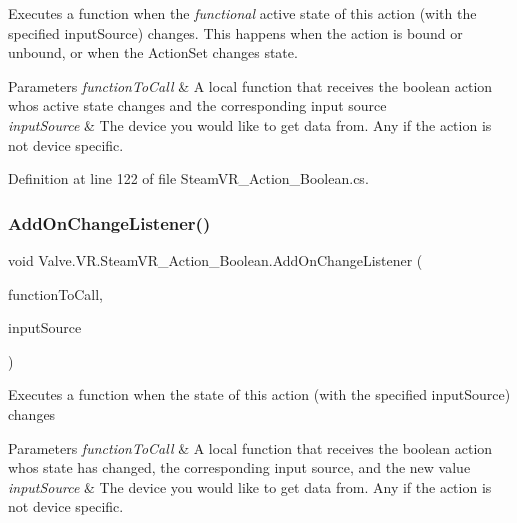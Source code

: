 Executes a function when the {\itshape functional} active state of this action (with the specified input\+Source) changes. This happens when the action is bound or unbound, or when the Action\+Set changes state. 


\begin{DoxyParams}{Parameters}
{\em function\+To\+Call} & A local function that receives the boolean action who\textquotesingle{}s active state changes and the corresponding input source\\
\hline
{\em input\+Source} & The device you would like to get data from. Any if the action is not device specific.\\
\hline
\end{DoxyParams}


Definition at line 122 of file Steam\+V\+R\+\_\+\+Action\+\_\+\+Boolean.\+cs.

\mbox{\label{class_valve_1_1_v_r_1_1_steam_v_r___action___boolean_a4f96bf86478f1e5f91dec7c32a4a8616}} 
\subsubsection{\texorpdfstring{AddOnChangeListener()}{AddOnChangeListener()}}
{\footnotesize\ttfamily void Valve.\+V\+R.\+Steam\+V\+R\+\_\+\+Action\+\_\+\+Boolean.\+Add\+On\+Change\+Listener (\begin{DoxyParamCaption}\item[{\mbox{\hyperlink{class_valve_1_1_v_r_1_1_steam_v_r___action___boolean_a9dbdff089d05d822688005fa19fef120}{Change\+Handler}}}]{function\+To\+Call,  }\item[{\mbox{\hyperlink{namespace_valve_1_1_v_r_a82e5bf501cc3aa155444ee3f0662853f}{Steam\+V\+R\+\_\+\+Input\+\_\+\+Sources}}}]{input\+Source }\end{DoxyParamCaption})}



Executes a function when the state of this action (with the specified input\+Source) changes 


\begin{DoxyParams}{Parameters}
{\em function\+To\+Call} & A local function that receives the boolean action who\textquotesingle{}s state has changed, the corresponding input source, and the new value\\
\hline
{\em input\+Source} & The device you would like to get data from. Any if the action is not device specific.\\
\hline
\end{DoxyParams}



